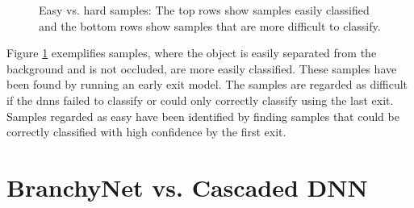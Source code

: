 \begin{figure}
	\captionsetup[subfigure]{justification=centering}
	\centering
	\hfill
	\caption[Easy vs. hard samples]{Easy vs. hard samples: The top rows show samples easily classified and the bottom rows show samples that are more difficult to classify. }
	\label{fig:hardvseasy}
\end{figure}

Figure \ref{fig:hardvseasy} exemplifies samples, where the object is easily separated from the background and is not occluded, are more easily classified. These samples have been found by running an early exit model. The samples are regarded as difficult if the \gls{dnn}s failed to classify or could only correctly classify using the last exit. Samples regarded as easy have been identified by finding samples that could be correctly classified with high confidence by the first exit.

\section{BranchyNet vs. Cascaded DNN} \label{sec:ee-branchy-vs-cascaded}

